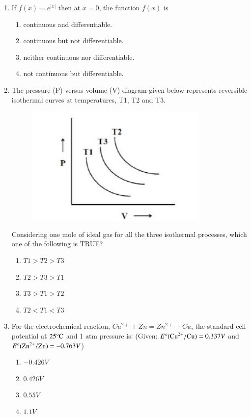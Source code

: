 \documentclass[journal]{IEEEtran}
\theoremstyle{remark}
\begin{document}
\begin{enumerate}
\item If $f(x)=e^{|x|}$ then at $x=0$, the function $f(x)$ is \hfill{}
\begin{multicols}{2}
\begin{enumerate}
    \item continuous and differentiable.
    \item continuous but not differentiable.
    \item neither continuous nor differentiable.
    \item not continuous but differentiable.
\end{enumerate}
\end{multicols}

\item The pressure (P) versus volume (V) diagram given below represents reversible isothermal curves at temperatures, T1, T2 and T3.
\begin{figure}[H]
    \centering
    \includegraphics[width=0.4\columnwidth]{figs/Q.4.png}
    \caption{}
    \label{fig:placeholder}
\end{figure}
Considering one mole of ideal gas for all the three isothermal processes, which one of the following is TRUE? \hfill{}
\begin{multicols}{2}
\begin{enumerate}
    \item $T1>T2>T3$
    \item $T2>T3>T1$
    \item $T3>T1>T2$
    \item $T2<T1<T3$
\end{enumerate}
\end{multicols}

\item For the electrochemical reaction, $Cu^{2+} + Zn = Zn^{2+} + Cu$, the standard cell potential at $25\degree\text{C}$ and 1 atm pressure is: (Given: $E\degree(\text{Cu}^{2+}/\text{Cu}) = 0.337 V$ and $E\degree(\text{Zn}^{2+}/\text{Zn}) = -0.763 V$) \hfill{}
\begin{multicols}{4}
\begin{enumerate}
    \item $-0.426 V$
    \item $0.426 V$
    \item $0.55 V$
    \item $1.1 V$
\end{enumerate}
\end{multicols}


\end{enumerate}
\end{document}
